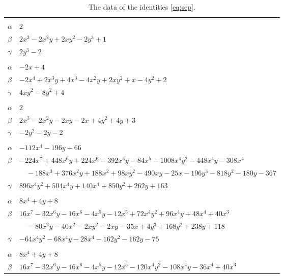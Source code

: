 \documentclass[11pt]{article}
\begin{document}
\begingroup\footnotesize
\setlength{\LTcapwidth}{\textwidth}
\begin{longtable}{@{}ll@{}}
\caption{The data of the identities \eqref{eq:sep}.}\label{tab:sep}\\
\hline\endfirsthead\hline\endhead\hline\endfoot
\multicolumn{2}{@{}l}{$\{i,j\}=\{0,2\}$, $k_{ij}=2^{3}$}\\
$\alpha$ & $2$\\
$\beta$ & $2x^{3}-2x^{2}y+2xy^{2}-2y^{3}+1$\\
$\gamma$ & $2y^{3}-2$\\
\addlinespace[3pt]
\multicolumn{2}{@{}l}{$\{i,j\}=\{0,10\}$, $k_{ij}=2^{3}$}\\
$\alpha$ & $-2x+4$\\
$\beta$ & $-2x^{4}+2x^{3}y+4x^{3}-4x^{2}y+2xy^{2}+x-4y^{2}+2$\\
$\gamma$ & $4xy^{2}-8y^{2}+4$\\
\addlinespace[3pt]
\multicolumn{2}{@{}l}{$\{i,j\}=\{0,27\}$, $k_{ij}=2^{3}$}\\
$\alpha$ & $2$\\
$\beta$ & $2x^{3}-2x^{2}y-2xy-2x+4y^{2}+4y+3$\\
$\gamma$ & $-2y^{2}-2y-2$\\
\addlinespace[3pt]
\multicolumn{2}{@{}l}{$\{i,j\}=\{1,15\}$, $k_{ij}=2^{3}\cdot 3^{2}$}\\
$\alpha$ & $-112x^{4}-196y-66$\\
$\beta$ & $-224x^{7}+448x^{6}y+224x^{6}-392x^{5}y-84x^{5}-1008x^{4}y^{2}-448x^{4}y-308x^{4}$\\
 & $\quad -188x^{3}+376x^{2}y+188x^{2}+98xy^{2}-490xy-25x-196y^{3}-818y^{2}-180y-367$\\
$\gamma$ & $896x^{4}y^{2}+504x^{4}y+140x^{4}+850y^{2}+262y+163$\\
\addlinespace[3pt]
\multicolumn{2}{@{}l}{$\{i,j\}=\{1,16\}$, $k_{ij}=2^{4}\cdot 3$}\\
$\alpha$ & $8x^{4}+4y+8$\\
$\beta$ & $16x^{7}-32x^{6}y-16x^{6}-4x^{5}y-12x^{5}+72x^{4}y^{2}+96x^{4}y+48x^{4}+40x^{3}$\\
 & $\quad -80x^{2}y-40x^{2}-2xy^{2}-2xy-35x+4y^{3}+168y^{2}+238y+118$\\
$\gamma$ & $-64x^{4}y^{2}-68x^{4}y-28x^{4}-162y^{2}-162y-75$\\
\addlinespace[3pt]
\multicolumn{2}{@{}l}{$\{i,j\}=\{1,21\}$, $k_{ij}=2^{4}\cdot 3$}\\
$\alpha$ & $8x^{4}+4y+8$\\
$\beta$ & $16x^{7}-32x^{6}y-16x^{6}-4x^{5}y-12x^{5}-120x^{4}y^{2}-108x^{4}y-36x^{4}+40x^{3}$\\

\end{longtable}
\end{document}

